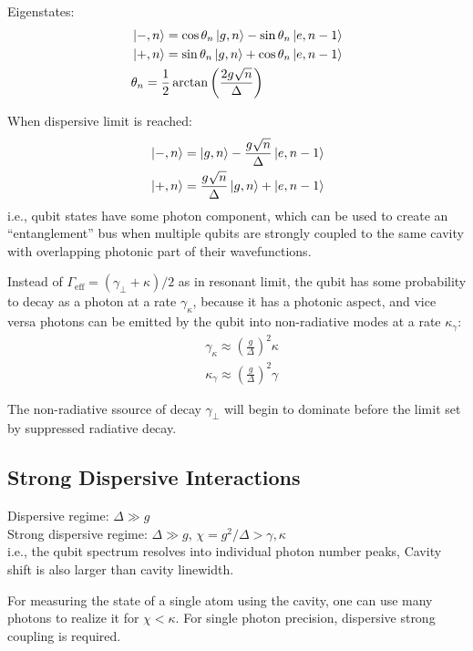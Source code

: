 \documentclass[8pt,a4paper,twocolumn]{article} %
\numberwithin{equation}{section} %
\begin{document}
			Eigenstates:
			\begin{align}
				& \ket{-,n} = \cos \theta_n \ket{g,n} -\sin \theta_n \ket{e,n-1}\\
				& \ket{+,n} = \sin \theta_n \ket{g,n} + \cos \theta_n \ket{e,n-1}\\
				& \theta_n = \frac{1}{2} \arctan \left( \frac{2g\sqrt n}{\Delta} \right)
			\end{align}

			When dispersive limit is reached:
			\begin{align}
				& \ket{-,n} =  \ket{g,n} -\frac{g\sqrt n}{\Delta}  \ket{e,n-1}\\
				& \ket{+,n} = \frac{g\sqrt n}{\Delta}  \ket{g,n} +   \ket{e,n-1}
			\end{align}
			i.e., qubit states have some photon component, which can be used to create an ``entanglement'' bus when multiple qubits are strongly coupled to the same cavity with overlapping photonic part of their wavefunctions.

			Instead of $\Gamma_{\text{eff} }=(\gamma_{\perp}+\kappa)/2 $ as in resonant limit, the qubit has some probability to decay as a photon at a rate $ \gamma_{\kappa} $, because it has a photonic aspect, and vice versa photons can be emitted by the qubit into non-radiative modes at a rate $\kappa_{\gamma} $:
			\begin{align}
				&\gamma_{\kappa}\approx \left( \frac{g}{\Delta} \right)^2 \kappa\\
				&\kappa_{\gamma}\approx \left( \frac{g}{\Delta} \right)^2 \gamma
			\end{align}

			The non-radiative ssource of decay $\gamma_{\perp}$ will begin to dominate before the limit set by suppressed radiative decay.


		\subsection{Strong Dispersive Interactions} %
		\label{sub:strong_dispersive_interactions}
			Dispersive regime: $\Delta\gg g$\\
			Strong dispersive regime: $\Delta\gg g$, $\chi = g^2/\Delta > \gamma, \kappa$\\
			i.e., the qubit spectrum resolves into individual photon number peaks, Cavity shift is also larger than cavity linewidth.

			For measuring the state of a single atom using the cavity, one can use many photons to realize it for $\chi<\kappa$. For single photon precision, dispersive strong coupling is required.
\end{document}
